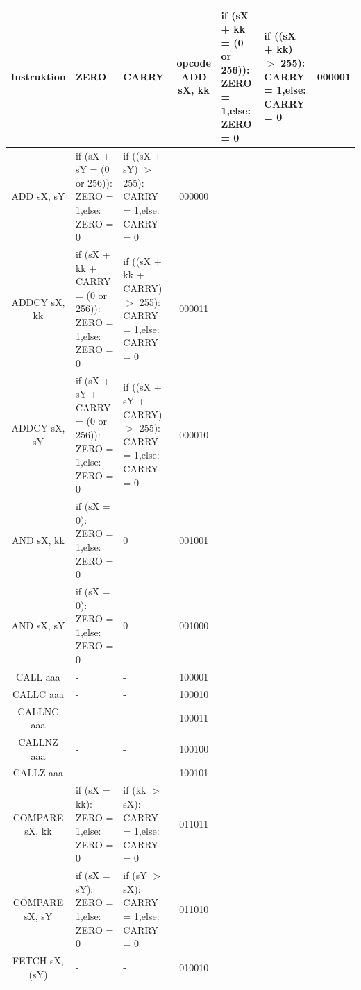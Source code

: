 \documentclass{scrartcl}
\begin{document}
\begin{longtable}{||c|p{6cm}|p{6cm}|c||}
\hline \hline
    Instruktion & ZERO & CARRY & opcode   \endhead \hline
    ADD sX, kk & if (sX + kk = (0 or 256)): ZERO = 1,\newline else: ZERO = 0
    & if ((sX + kk) $>$ 255): CARRY = 1,\newline else: CARRY = 0 & 000001 \\ \hline
    ADD sX, sY & if (sX + sY = (0 or 256)): ZERO = 1,\newline else: ZERO = 0
    & if ((sX + sY) $>$ 255): CARRY = 1,\newline else: CARRY = 0 & 000000 \\ \hline
    ADDCY sX, kk & if (sX + kk + CARRY = (0 or 256)): ZERO = 1,\newline else: ZERO = 0
    & if ((sX + kk + CARRY) $>$ 255): CARRY = 1,\newline else: CARRY = 0 & 000011 \\ \hline
    ADDCY sX, sY & if (sX + sY + CARRY = (0 or 256)): ZERO = 1,\newline else: ZERO = 0
    & if ((sX + sY + CARRY) $>$ 255): CARRY = 1,\newline else: CARRY = 0 & 000010 \\ \hline
    AND sX, kk & if (sX = 0): ZERO = 1,\newline else: ZERO = 0 & 0 & 001001 \\ \hline
    AND sX, sY & if (sX = 0): ZERO = 1,\newline else: ZERO = 0 & 0 & 001000 \\ \hline
    CALL aaa & - & - & 100001 \\ \hline
    CALLC aaa  & - & - & 100010 \\ \hline
    CALLNC aaa & - & - & 100011 \\ \hline
    CALLNZ aaa & - & - & 100100 \\ \hline
    CALLZ aaa & - & - & 100101 \\ \hline
    COMPARE sX, kk & if (sX = kk): ZERO = 1,\newline else: ZERO = 0
    & if (kk $>$ sX): CARRY = 1,\newline else: CARRY = 0 & 011011 \\ \hline
    COMPARE sX, sY & if (sX = sY): ZERO = 1,\newline else: ZERO = 0
    & if (sY $>$ sX): CARRY = 1,\newline else: CARRY = 0 & 011010 \\ \hline
    FETCH sX, (sY) & - & - & 010010 \\ \hline

\end{longtable}
\end{document}
